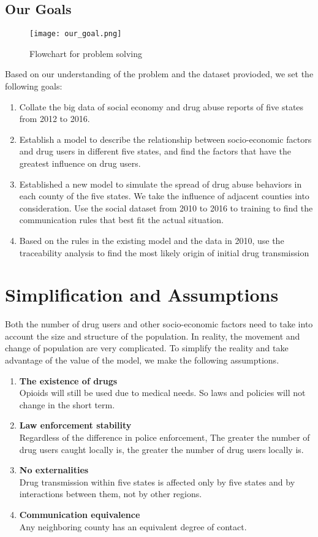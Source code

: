 \documentclass{mcmthesis}
\begin{document}
\subsection{Our Goals}
\begin{figure}[!h]
\small
\centering
\texttt{[image: our\_goal.png]}
\caption{Flowchart for problem solving} \label{fig:our goal}
\end{figure}
Based on our understanding of the problem and the dataset provioded, we set the following goals:
\begin{enumerate}
\item Collate the big data of social economy and drug abuse reports of five states from 2012 to 2016.
\item Establish a model to describe the relationship between socio-economic factors and drug users in different five states, and find the factors that have the greatest influence on drug users.
\item Established a new model to simulate the spread of drug abuse behaviors in each county of the five states. We take the influence of adjacent counties into consideration. Use the social dataset from 2010 to 2016 to training to find the communication rules that best fit the actual situation.
\item Based on the rules in the existing model and the data in 2010, use the traceability analysis to find the most likely origin of initial drug transmission
\end{enumerate}

\section{Simplification and Assumptions}

Both the number of drug users and other socio-economic factors need to take into account the size and structure of the population. In reality, the movement and change of population are very complicated. To simplify the reality and take advantage of the value of the model, we make the following assumptions.\par
\begin{enumerate}
 \item  \textbf{The existence of drugs}\\
  Opioids will still be used due to medical needs. So laws and policies will not change in the short term.
 \item \textbf{Law enforcement stability}\\
  Regardless of the difference in police enforcement, The greater the number of drug users caught locally is, the greater the number of drug users locally is.
 \item \textbf{No externalities}\\
  Drug transmission within five states is affected only by five states and by interactions between them, not by other regions.
 \item \textbf{Communication equivalence}\\
  Any neighboring county has an equivalent degree of contact.
\end{enumerate}
\end{document}
